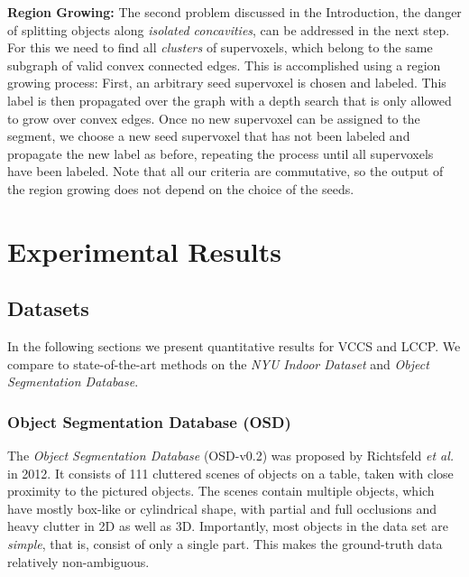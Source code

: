 \textbf{Region Growing:}
The second problem discussed in the Introduction, the danger of splitting objects along {\em isolated concavities}, can be addressed in the next step. For this we need to find all {\em clusters} of supervoxels, which belong to the same subgraph of valid convex connected edges. This is accomplished using a region growing process: First, an arbitrary seed supervoxel is chosen and labeled. This label is then propagated over the graph with a depth search that is only allowed to grow over convex edges. Once no new supervoxel can be assigned to the segment, we choose a new seed supervoxel that has not been labeled and propagate the new label as before, repeating the process until all supervoxels have been labeled. Note that all our criteria are commutative, so the output of the region growing does not depend on the choice of the seeds.\\



\section{Experimental Results}
\subsection{Datasets}
In the following sections we present quantitative results for VCCS and LCCP. We compare to state-of-the-art methods on the \textit{NYU Indoor Dataset}\cite{Silberman:ECCV12} and \textit{Object Segmentation Database}\cite{Richtsfeld:IROS12}. 

\subsubsection{Object Segmentation Database (OSD)}
The \textit{Object Segmentation Database} (OSD-v0.2) was proposed by Richtsfeld \textit{et al.}\cite{Richtsfeld:IROS12} in 2012. It consists of 111 cluttered scenes of objects on a table, taken with close proximity to the pictured objects. The scenes contain multiple objects, which have mostly box-like or cylindrical shape, with partial and full occlusions and heavy clutter in 2D as well as 3D. Importantly, most objects in the data set are \textit{simple}, that is, consist of only a single part. This makes the ground-truth data relatively non-ambiguous.

